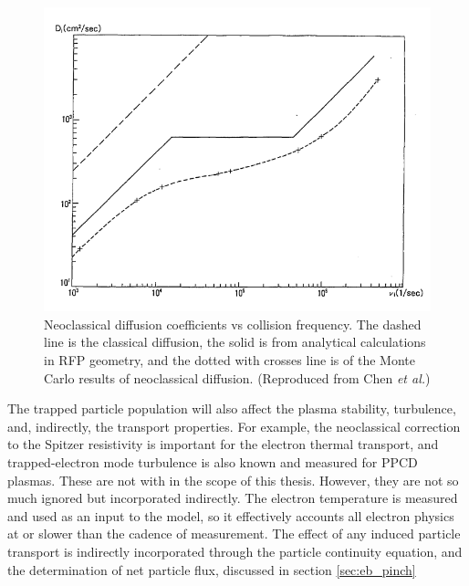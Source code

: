 \begin{refsection}
\begin{figure}[!htb]
	\centering
	\includegraphics[width = 0.75\linewidth]{./transport_modeling/neo_class_diff.png}
    \caption[Neoclassical diffusion coefficient for RFPs]{Neoclassical diffusion coefficients vs collision frequency. The dashed line is the classical diffusion, the solid is from analytical calculations in RFP geometry, and the dotted with crosses line is of the Monte Carlo results of neoclassical diffusion. (Reproduced from Chen \textit{et al.}\cite{Chen1992})}
\end{figure}%

The trapped particle population will also affect the plasma stability, turbulence, and, indirectly, the transport properties. For example, the neoclassical correction to the Spitzer resistivity is important for the electron thermal transport, and trapped-electron mode turbulence is also known and measured for PPCD plasmas. These are not with in the scope of this thesis. However, they are not so much ignored but incorporated indirectly. The electron temperature is measured and used as an input to the model, so it effectively accounts all electron physics at or slower than the cadence of measurement. The effect of any induced particle transport is indirectly incorporated through the particle continuity equation, and the determination of net particle flux, discussed in section \ref{sec:eb_pinch}


\end{refsection}
